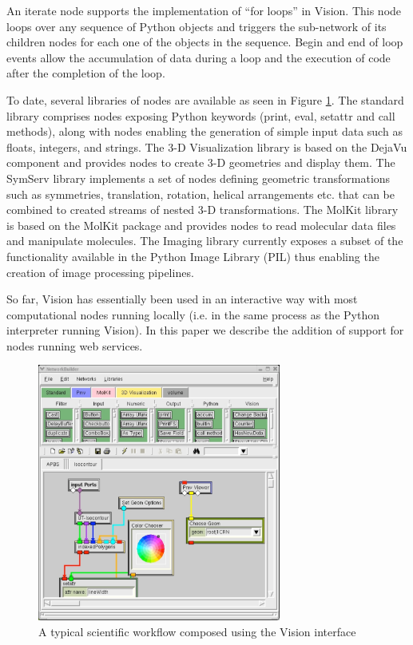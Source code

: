 \documentclass[conference]{IEEEtran}
\begin{document}
An iterate node supports the implementation of “for loops” in Vision. This
node loops over any sequence of Python objects and triggers the sub-network
of its children nodes for each one of the objects in the sequence. Begin
and end of loop events allow the accumulation of data during a loop and the
execution of code after the completion of the loop. 

To date, several libraries of nodes are available as seen in Figure
\ref{fig:vision-overview}. The standard library comprises nodes exposing
Python keywords (print, eval, setattr and call methods), along with nodes
enabling the generation of simple input data such as floats, integers, and
strings. The 3-D Visualization library is based on the DejaVu component and
provides nodes to create 3-D geometries and display them. The SymServ
library implements a set of nodes defining geometric transformations such
as symmetries, translation, rotation, helical arrangements etc. that can be
combined to created streams of nested 3-D transformations. The MolKit
library is based on the MolKit package and provides nodes to read molecular
data files and manipulate molecules. The Imaging library currently exposes
a subset of the functionality available in the Python Image Library (PIL)
thus enabling the creation of image processing pipelines.

So far, Vision has essentially been used in an interactive way with most
computational nodes running locally (i.e. in the same process as the Python
interpreter running Vision). In this paper we describe the addition of
support for nodes running web services. 

\begin{figure}
\begin{center}
\includegraphics[width=8cm]{vision-overview}
\end{center}
\caption{A typical scientific workflow composed using the Vision interface}
\label{fig:vision-overview}
\end{figure}
\end{document}
